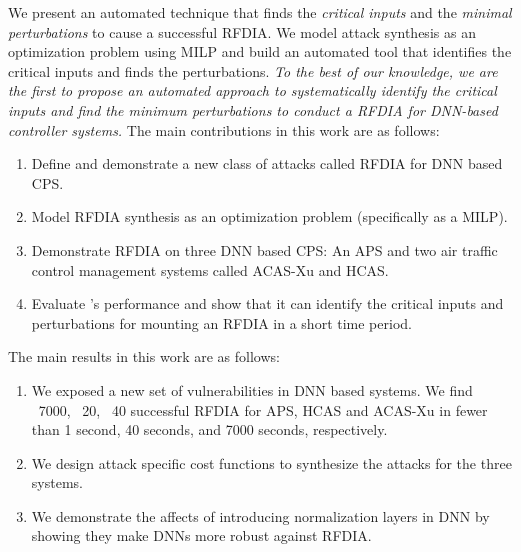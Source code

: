 We present an automated technique that finds the \textit{critical inputs} and the \textit{minimal perturbations} to cause a successful \ac{RFDIA}. 
We model attack synthesis as an optimization problem using \ac{MILP} and build an automated tool \tool that identifies the critical inputs and finds the perturbations.
{\em To the best of our knowledge, we are the first to  propose an automated approach to systematically identify the critical inputs and find the minimum perturbations to conduct a \ac{RFDIA} for DNN-based controller systems.
}
The main contributions in this work are as follows:

\begin{enumerate}
	\item Define and demonstrate a new class of attacks called \ac{RFDIA} for \ac{DNN} based \ac{CPS}. 
	\item Model \ac{RFDIA} synthesis as an optimization problem (specifically as a \ac{MILP}). 
	\item Demonstrate \ac{RFDIA} on three \ac{DNN} based \ac{CPS}:  An \ac{APS} and two air traffic control management systems called \ac{ACAS-Xu} and \ac{HCAS}.
	\item Evaluate \tool's performance and show that it can identify the critical inputs and perturbations for mounting an \ac{RFDIA} in a short time period.  
\end{enumerate}

The main results in this work are as follows:

\begin{enumerate}
	\item We exposed a new set of vulnerabilities in \ac{DNN} based systems. 
	 We find ~7000, ~20, ~40 successful \ac{RFDIA} for \ac{APS}, \ac{HCAS} and \ac{ACAS-Xu} in fewer than 1 second, 40 seconds, and 7000 seconds, respectively. 
	\item We design attack specific cost functions to synthesize the attacks for the three systems.
	\item We demonstrate the affects of introducing normalization layers in \ac{DNN} by showing they make \ac{DNN}s more robust against \ac{RFDIA}. 
\end{enumerate}

